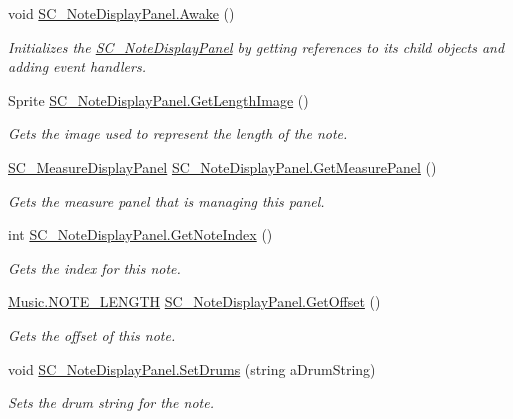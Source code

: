 \begin{DoxyCompactItemize}
\item 
void \hyperlink{group___s_c___n_d_p_unity_ga131f594d4f9b5887acb0de0a8bb5532a}{S\+C\+\_\+\+Note\+Display\+Panel.\+Awake} ()
\begin{DoxyCompactList}\small\item\em Initializes the \hyperlink{class_s_c___note_display_panel}{S\+C\+\_\+\+Note\+Display\+Panel} by getting references to its child objects and adding event handlers. \end{DoxyCompactList}\item 
Sprite \hyperlink{group___s_c___n_d_p_unity_ga1038892636ae54a79c675287c4bb6fff}{S\+C\+\_\+\+Note\+Display\+Panel.\+Get\+Length\+Image} ()
\begin{DoxyCompactList}\small\item\em Gets the image used to represent the length of the note. \end{DoxyCompactList}\item 
\hyperlink{class_s_c___measure_display_panel}{S\+C\+\_\+\+Measure\+Display\+Panel} \hyperlink{group___s_c___n_d_p_unity_ga404972fc48a89d678d0c6fa801573814}{S\+C\+\_\+\+Note\+Display\+Panel.\+Get\+Measure\+Panel} ()
\begin{DoxyCompactList}\small\item\em Gets the measure panel that is managing this panel. \end{DoxyCompactList}\item 
int \hyperlink{group___s_c___n_d_p_unity_ga8beef050026ade4ba4ccb574c414d24e}{S\+C\+\_\+\+Note\+Display\+Panel.\+Get\+Note\+Index} ()
\begin{DoxyCompactList}\small\item\em Gets the index for this note. \end{DoxyCompactList}\item 
\hyperlink{group___music_enums_gaf11b5f079adbb21c800b9eca1c5c3cbd}{Music.\+N\+O\+T\+E\+\_\+\+L\+E\+N\+G\+TH} \hyperlink{group___s_c___n_d_p_unity_ga371654221730812200062322c8a3e750}{S\+C\+\_\+\+Note\+Display\+Panel.\+Get\+Offset} ()
\begin{DoxyCompactList}\small\item\em Gets the offset of this note. \end{DoxyCompactList}\item 
void \hyperlink{group___s_c___n_d_p_unity_gae14b5564be204df7699b95186d83f69f}{S\+C\+\_\+\+Note\+Display\+Panel.\+Set\+Drums} (string a\+Drum\+String)
\begin{DoxyCompactList}\small\item\em Sets the drum string for the note. \end{DoxyCompactList}\item 

\end{DoxyCompactItemize}

